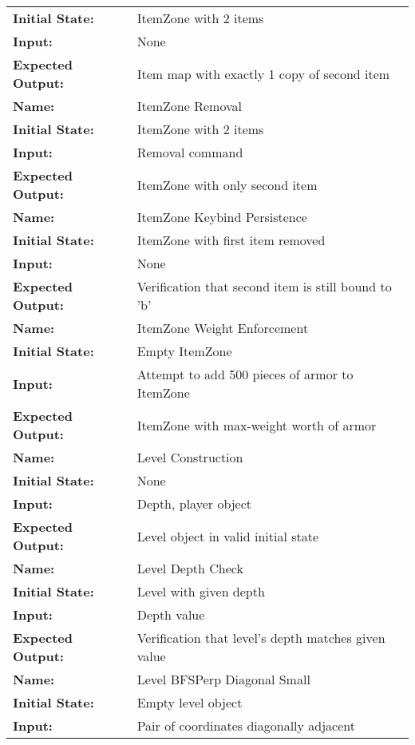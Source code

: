 \documentclass[12pt, titlepage]{article}
\begin{document}
\begin{center}
\begin{longtable}{ l | p{10cm} }
				\textbf{Initial State:} & ItemZone with 2 items\\
				\textbf{Input:} & None\\
				\textbf{Expected Output:} & Item map with exactly 1 copy of second item\\[0.6em]
				\hline
				\rule{0pt}{1.5em}\textbf{Name:} & ItemZone Removal\\
				\textbf{Initial State:} & ItemZone with 2 items\\
				\textbf{Input:} & Removal command\\
				\textbf{Expected Output:} & ItemZone with only second item\\[0.6em]
				\hline
				\rule{0pt}{1.5em}\textbf{Name:} & ItemZone Keybind Persistence\\
				\textbf{Initial State:} & ItemZone with first item removed\\
				\textbf{Input:} & None\\
				\textbf{Expected Output:} & Verification that second item is still bound to 'b'\\[0.6em]
				\hline
				\rule{0pt}{1.5em}\textbf{Name:} & ItemZone Weight Enforcement\\
				\textbf{Initial State:} & Empty ItemZone\\
				\textbf{Input:} & Attempt to add 500 pieces of armor to ItemZone\\
				\textbf{Expected Output:} & ItemZone with max-weight worth of armor\\[0.6em]
				\hline
				\rule{0pt}{1.5em}\textbf{Name:} & Level Construction\\
				\textbf{Initial State:} & None\\
				\textbf{Input:} & Depth, player object\\
				\textbf{Expected Output:} & Level object in valid initial state\\[0.6em]
				\hline
				\rule{0pt}{1.5em}\textbf{Name:} & Level Depth Check\\
				\textbf{Initial State:} & Level with given depth\\
				\textbf{Input:} & Depth value\\
				\textbf{Expected Output:} & Verification that level's depth matches given value\\[0.6em]
				\hline
				\rule{0pt}{1.5em}\textbf{Name:} & Level BFSPerp Diagonal Small\\
				\textbf{Initial State:} & Empty level object\\
				\textbf{Input:} & Pair of coordinates diagonally adjacent\\

\end{longtable}
\end{center}
\end{document}
